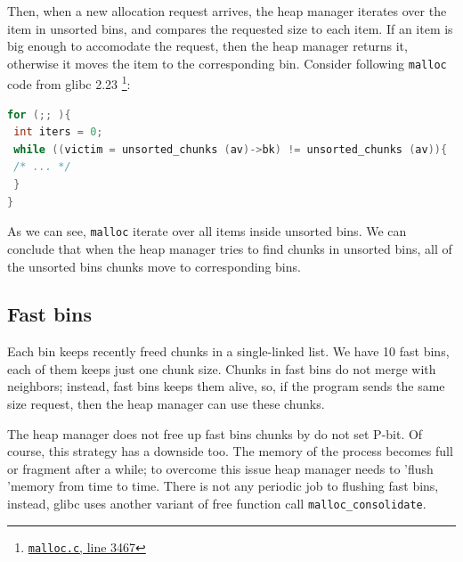 \documentclass{masterthesis}
\newcommand*\libc{glibc}
\newcommand*\fb{fast bins}
\newcommand*\ub{unsorted bins}
\newcommand*\Fb{Fast bins\xspace}
\newcommand*\mallocc{\lstinline{malloc}\xspace}
\begin{document}
Then, when a new allocation request arrives, the heap manager iterates over the item in \ub{}, and compares the requested size to each item. If an item is big enough to accomodate the request, then the heap manager returns it, otherwise it moves the item to the corresponding bin. Consider following \mallocc{} code from \libc{} 2.23 \footnote{\href{https://sourceware.org/git/?p=glibc.git;a=blob;f=malloc/malloc.c;hb=ad372e296b6b944884f14fb5d8f3a6195bfba22b\#l3467}{\texttt{malloc.c}, line 3467}}:

\begin{lstlisting}[language=c,frame=tlrb]
for (;; ){
 int iters = 0;
 while ((victim = unsorted_chunks (av)->bk) != unsorted_chunks (av)){
 /* ... */
 }
}
\end{lstlisting}

As we can see, \mallocc{} iterate over all items inside \ub{}. We can conclude that when the heap manager tries to find chunks in \ub{}, all of the \ub{} chunks move to corresponding bins.

\subsection{\Fb}
Each bin keeps recently freed chunks in a single-linked list. We have 10 \fb{}, each of them keeps just one chunk size. Chunks in \fb{} do not merge with neighbors; instead, \fb{} keeps them alive, so, if the program sends the same size request, then the heap manager can use these chunks.

The heap manager does not free up \fb{} chunks by do not set P-bit. Of course, this strategy has a downside too. The memory of the process becomes full or fragment after a while; to overcome this issue heap manager needs to 'flush 'memory from time to time. There is not any periodic job to flushing \fb{}, instead, \libc{} uses another variant of free function call \lstinline{malloc_consolidate}.
\end{document}
